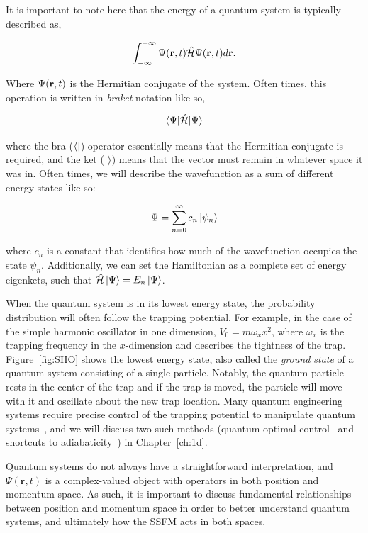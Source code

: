 It is important to note here that the energy of a quantum system is typically described as,

\begin{equation}
\int_{-\infty}^{+\infty}\Psi(\mathbf{r},t)\*\mathcal{\hat H}\Psi(\mathbf{r},t)d\mathbf{r}.
\end{equation}

\noindent Where $\Psi(\mathbf{r},t)\*$ is the Hermitian conjugate of the system.
Often times, this operation is written in \textit{braket} notation like so,

\begin{equation}
\braket{\Psi|\mathcal{\hat H}|\Psi}
\end{equation}

\noindent where the bra ($\bra{}$) operator essentially means that the Hermitian conjugate is required, and the ket ($\ket{}$) means that the vector must remain in whatever space it was in.
Often times, we will describe the wavefunction as a sum of different energy states like so:

\begin{equation}
\Psi = \sum_{n=0}^{\infty}c_n\ket{\psi_n}
\end{equation}

\noindent where $c_n$ is a constant that identifies how much of the wavefunction occupies the state $\psi_n$.
Additionally, we can set the Hamiltonian as a complete set of energy eigenkets, such that $\mathcal{\hat H}\ket{\Psi} = E_n\ket{\Psi}$.

When the quantum system is in its lowest energy state, the probability distribution will often follow the trapping potential.
For example, in the case of the simple harmonic oscillator in one dimension, $V_0 = m \omega_x x^2$, where $\omega_x$ is the trapping frequency in the $x$-dimension and describes the tightness of the trap.
Figure~\ref{fig:SHO} shows the lowest energy state, also called the \textit{ground state} of a quantum system consisting of a single particle.
Notably, the quantum particle rests in the center of the trap and if the trap is moved, the particle will move with it and oscillate about the new trap location.
Many quantum engineering systems require precise control of the trapping potential to manipulate quantum systems~\cite{menchon2016}, and we will discuss two such methods (quantum optimal control~\cite{werschnik2007} and shortcuts to adiabaticity~\cite{guery2019}) in Chapter~\ref{ch:1d}.

Quantum systems do not always have a straightforward interpretation, and $\Psi(\mathbf{r},t)$ is a complex-valued object with operators in both position and momentum space.
As such, it is important to discuss fundamental relationships between position and momentum space in order to better understand quantum systems, and ultimately how the SSFM acts in both spaces.


